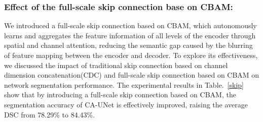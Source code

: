 \begin{table}[htbp]
\caption{Ablation study on the effect of downsampling module based on Res block}\label{down}
\footnotesize
{}
\centering
\end{table}

\subsubsection{Effect of the full-scale skip connection base on CBAM:}

We introduced a full-scale skip connection based on CBAM, which autonomously learns and aggregates the feature information of all levels of the encoder through spatial and channel attention, reducing the semantic gap caused by the blurring of feature mapping between the encoder and decoder. To explore its effectiveness, we discussed the impact of traditional skip connection based on channel dimension concatenation(CDC) and full-scale skip connection based on CBAM on network segmentation performance. The experimental results in Table.~\ref{skip} show that by introducing a full-scale skip connection based on CBAM, the segmentation accuracy of CA-UNet is effectively improved, raising the average DSC from 78.29\% to 84.43\%.

\begin{table}[htbp]
    \caption{Ablation study on the effect of downsampling module based on the residual structure}\label{skip}
    \footnotesize
    \centering
    \end{table}

